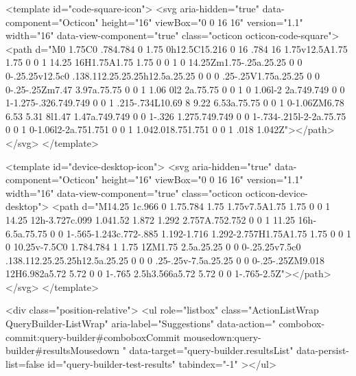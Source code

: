 <template id="code-square-icon">
  <svg aria-hidden="true" data-component="Octicon" height="16" viewBox="0 0 16 16" version="1.1" width="16" data-view-component="true" class="octicon octicon-code-square">
    <path d="M0 1.75C0 .784.784 0 1.75 0h12.5C15.216 0 16 .784 16 1.75v12.5A1.75 1.75 0 0 1 14.25 16H1.75A1.75 1.75 0 0 1 0 14.25Zm1.75-.25a.25.25 0 0 0-.25.25v12.5c0 .138.112.25.25.25h12.5a.25.25 0 0 0 .25-.25V1.75a.25.25 0 0 0-.25-.25Zm7.47 3.97a.75.75 0 0 1 1.06 0l2 2a.75.75 0 0 1 0 1.06l-2 2a.749.749 0 0 1-1.275-.326.749.749 0 0 1 .215-.734L10.69 8 9.22 6.53a.75.75 0 0 1 0-1.06ZM6.78 6.53 5.31 8l1.47 1.47a.749.749 0 0 1-.326 1.275.749.749 0 0 1-.734-.215l-2-2a.75.75 0 0 1 0-1.06l2-2a.751.751 0 0 1 1.042.018.751.751 0 0 1 .018 1.042Z"></path>
</svg>
</template>

<template id="device-desktop-icon">
  <svg aria-hidden="true" data-component="Octicon" height="16" viewBox="0 0 16 16" version="1.1" width="16" data-view-component="true" class="octicon octicon-device-desktop">
    <path d="M14.25 1c.966 0 1.75.784 1.75 1.75v7.5A1.75 1.75 0 0 1 14.25 12h-3.727c.099 1.041.52 1.872 1.292 2.757A.752.752 0 0 1 11.25 16h-6.5a.75.75 0 0 1-.565-1.243c.772-.885 1.192-1.716 1.292-2.757H1.75A1.75 1.75 0 0 1 0 10.25v-7.5C0 1.784.784 1 1.75 1ZM1.75 2.5a.25.25 0 0 0-.25.25v7.5c0 .138.112.25.25.25h12.5a.25.25 0 0 0 .25-.25v-7.5a.25.25 0 0 0-.25-.25ZM9.018 12H6.982a5.72 5.72 0 0 1-.765 2.5h3.566a5.72 5.72 0 0 1-.765-2.5Z"></path>
</svg>
</template>

        <div class="position-relative">
                        <ul
              role="listbox"
              class="ActionListWrap QueryBuilder-ListWrap"
              aria-label="Suggestions"
              data-action="
                combobox-commit:query-builder#comboboxCommit
                mousedown:query-builder#resultsMousedown
              "
              data-target="query-builder.resultsList"
              data-persist-list=false
              id="query-builder-test-results"
              tabindex="-1"
            ></ul>

